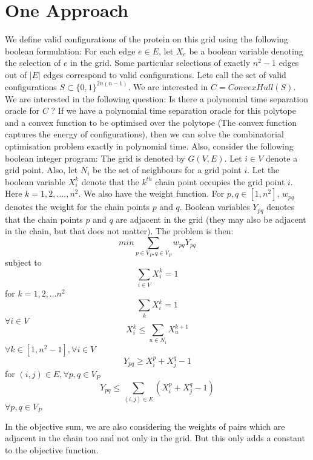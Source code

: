 \documentclass[12pt]{article}
\theoremstyle{definition}
\theoremstyle{remark}
\begin{document}
\section{One Approach}

We define valid configurations of the protein on this grid using the following boolean formulation: For each edge $e \in E$, let $X_e$ be a boolean variable denoting the selection of $e$ in the grid. Some particular selections of  exactly $n^2 - 1$ edges out of $|E|$ edges correspond to valid configurations. Lets call the set of valid configurations $S \subset \{0,1\}^{2n(n-1)}$. We are interested in $C = ConvexHull(S)$. We are interested in the following question:
\newline
\newline
Is there a polynomial time separation oracle for $C$ ?
\newline
\newline
If we have a polynomial time separation oracle for this polytope and a convex function to be optimised over the polytope (The convex function captures the energy of configurations), then we can solve the combinatorial optimisation problem exactly in polynomial time. Also, consider the following boolean integer program:  
\newline
\newline
The grid is denoted by $G(V,E)$. Let $i \in V$ denote a grid point. Also, let $N_i$ be the set of neighbours for a grid point $i$. Let the boolean variable $X_{i}^k$ denote that the $k^{th}$ chain point occupies the grid point $i$. Here $k = 1,2,....,n^2$. We also have the weight function. For $p,q \in [1,n^2]$, $w_{pq}$ denotes the weight for the chain points $p$ and $q$. Boolean variables $Y_{pq}$ denotes that the chain points $p$ and $q$ are adjacent in the grid (they may also be adjacent in the chain, but that does not matter). The problem is then:
$$
	min \sum_{p \in V_P,q \in V_P} w_{pq} Y_{pq} 
$$
	subject to 
$$
	\sum_{i \in V} X_{i}^k = 1 
$$ 
for $k = 1,2, \ldots n^2$
$$ 
	\sum_{k} X_{i}^k = 1 
$$ 
$\forall i \in V$
$$
	X_{i}^k \leq \sum_{u \in N_i} X_{u}^{k+1}
$$
$\forall k \in [1,n^2-1],\forall i \in V$ 	
$$	
	Y_{pq} \geq X_i^p + X_j^q - 1 
$$
for $(i,j) \in E, \forall p,q \in V_P$
$$
	Y_{pq} \leq \sum_{(i,j) \in E} (X_i^p + X_j^q - 1)
$$
$\forall p,q \in V_P$ 

In the objective sum, we are also considering the weights of pairs which are adjacent in the chain too and not only in the grid. But this only adds a constant to the objective function. 
\end{document}
